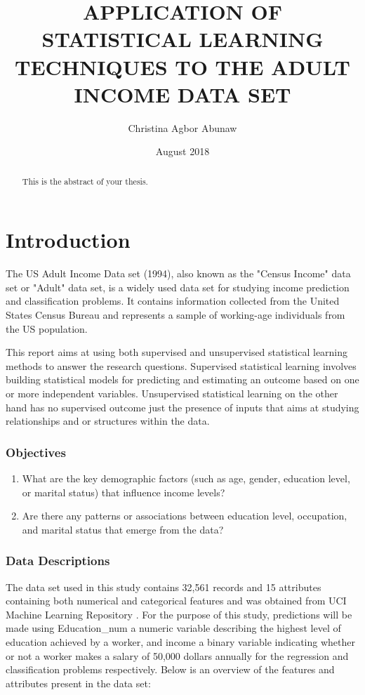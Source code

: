 \documentclass[12pt,a4paper,twoside,openright]{report}
\title{APPLICATION OF STATISTICAL LEARNING TECHNIQUES TO THE ADULT INCOME DATA SET}
\author{Christina Agbor Abunaw}
\date{August 2018}
\begin{document}
\maketitle

\begin{abstract}
This is the abstract of your thesis.
\end{abstract}

\tableofcontents

\listoffigures

\listoftables

\chapter{Introduction}
The US Adult Income Data set (1994), also known as the "Census Income" data set or "Adult" data set, is a widely used data set for studying income prediction and classification problems. It contains information collected from the United States Census Bureau and represents a sample of working-age individuals from the US population.

This report aims at using both supervised and unsupervised statistical learning methods to answer the research questions. Supervised statistical learning involves building  statistical models for predicting and estimating an outcome based on one or more independent variables\cite{tib}. Unsupervised statistical learning on the other hand has no supervised outcome just the presence of inputs that aims at studying relationships and or structures within the data. 

\subsection{Objectives}
\begin{enumerate}
\item What are the key demographic factors (such as age, gender, education level, or marital status) that influence income levels?
\item Are there any patterns or associations between education level, occupation, and marital status that emerge from the data?
\end{enumerate}


\subsection{Data Descriptions}
The data set used in this study contains 32,561 records and 15 attributes containing both numerical and categorical features and was obtained from UCI Machine Learning Repository \cite{uci}. For the purpose of this study, predictions will be made using Education\_num a numeric variable describing the highest level of education achieved by a worker, and income a binary variable indicating whether or not a worker makes a salary of 50,000 dollars annually for the regression and classification problems respectively. Below is an overview of the features and attributes present in the data set: \\
\end{document}
